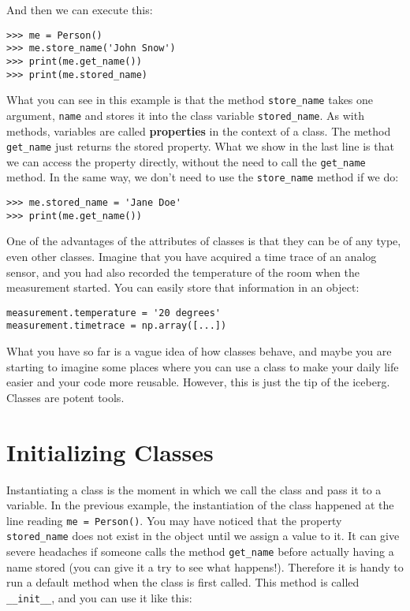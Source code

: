 And then we can execute this:

\begin{verbatim}
>>> me = Person()
>>> me.store_name('John Snow')
>>> print(me.get_name())
>>> print(me.stored_name)
\end{verbatim}

What you can see in this example is that the method \texttt{store_name} takes one argument, \texttt{name} and stores it into the class variable \texttt{stored_name}. As with methods, variables are called \textbf{properties} in the context of a class. The method \texttt{get_name} just returns the stored property. What we show in the last line is that we can access the property directly, without the need to call the \texttt{get_name} method. In the same way, we don't need to use the \texttt{store_name} method if we do:

\begin{verbatim}
>>> me.stored_name = 'Jane Doe'
>>> print(me.get_name())
\end{verbatim}

One of the advantages of the attributes of classes is that they can be of any type, even other classes. Imagine that you have acquired a time trace of an analog sensor, and you had also recorded the temperature of the room when the measurement started. You can easily store that information in an object:

\begin{verbatim}
measurement.temperature = '20 degrees'
measurement.timetrace = np.array([...])
\end{verbatim}

What you have so far is a vague idea of how classes behave, and maybe you are starting to imagine some places where you can use a class to make your daily life easier and your code more reusable. However, this is just the tip of the iceberg. Classes are potent tools.

\section{Initializing Classes}\label{sec:initializing-classes}
Instantiating a class is the moment in which we call the class and pass it to a variable. In the previous example, the instantiation of the class happened at the line reading \texttt{me = Person()}. You may have noticed that the property \texttt{stored_name} does not exist in the object until we assign a value to it. It can give severe headaches if someone calls the method \texttt{get_name} before actually having a name stored (you can give it a try to see what happens!). Therefore it is handy to run a default method when the class is first called. This method is called \texttt{__init__}, and you can use it like this:

